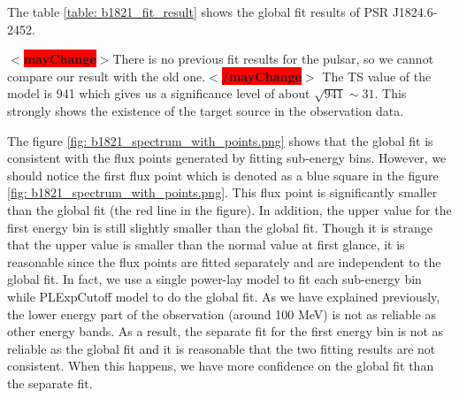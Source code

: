 \documentclass[12pt]{report}
\newcommand{\mayChange}[1]{
  $<$\colorbox{red}{\textbf{mayChange}}$>$#1$<$\colorbox{red}{\textbf{/mayChange}}$>$
}
\begin{document}
            The table \ref{table: b1821_fit_result} shows the global fit results of PSR J1824.6-2452. 
            \mayChange{There is no previous fit results for the pulsar, so we cannot compare our result
            with the old one.} The TS value of the model is 941 which gives us a significance level 
            of about $\sqrt{941} \sim 31$. This strongly shows the existence of the target source in 
            the observation data.

            The figure \ref{fig: b1821_spectrum_with_points.png} shows that the global fit is consistent with 
            the flux points generated by fitting sub-energy bins. However, we should notice the first flux point 
            which is denoted as a blue square in the figure \ref{fig: b1821_spectrum_with_points.png}. This 
            flux point is significantly smaller than the global fit (the red line in the figure). 
            In addition, the upper value for the first energy bin is still slightly smaller than the global fit. 
            Though it is strange that the upper value is smaller than the normal value at first glance, 
            it is reasonable since the flux points are fitted separately and are independent to 
            the global fit. In fact, we use a single power-lay model to fit each sub-energy bin while PLExpCutoff
            model to do the global fit. As we have explained previously, the lower energy part of the 
            observation (around 100 MeV) is not as reliable as other energy bands. As a result, the separate 
            fit for the first energy bin
            is not as reliable as the global fit and it is reasonable that the two fitting results are not 
            consistent. When this happens, we have more confidence on the global fit than the separate fit.
            
\end{document}
